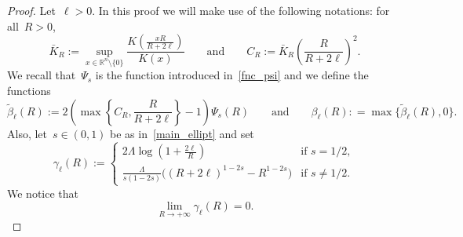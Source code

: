 \documentclass[10pt,a4paper]{amsart}
\numberwithin{equation}{section}
\newcommand{\R}{\mathbb{R}}
\begin{document}
\begin{proof}
Let~$\ell>0$. In this proof we will make use of the following notations:
for all~$R>0$,
\begin{equation*}
\bar{K}_R:= \sup_{x \in \R^n \setminus\{0\}} \frac{K(\frac{xR}{R+2\ell})}{K(x)}
\qquad{\mbox{and}}\qquad
C_R := \bar{K}_R\left(\frac{R}{R+2\ell} \right)^2 .
\end{equation*}
We recall that~$\Psi_s$ is the function introduced in~\eqref{fnc_psi} and we define the functions
\[\widetilde{\beta}_{\ell}(R):= 2 \left( \max\left\{C_R, \frac{R}{R+2\ell}\right\}-1 \right)\Psi_s(R)\qquad{\mbox{and}}\qquad \beta_{\ell}(R): = \max \big\{ \widetilde{\beta}_{\ell}(R),0 \big\}.\]
Also, let~$s\in (0,1)$ be as in~\eqref{main_ellipt} and set
\begin{equation*}
\gamma_{\ell}(R) :=
\begin{cases}
\displaystyle 2\Lambda \log\left( 1 +\frac{{2}\ell}{R} \right)
&\mbox{if } s = 1/2 ,\\
\displaystyle 
\frac{\Lambda}{s(1-2s)} \big( (R+2\ell)^{1-2s}-R^{1-2s} \big)&\mbox{if } s \neq 1/2 .
\end{cases}
\end{equation*}
We notice that
 \begin{equation}\label{mnbvcx12wsxdr5tgbhuuj}
\lim_{R\to +\infty}\gamma_{\ell}(R)=0.
\end{equation}


\end{proof}
\end{document}
